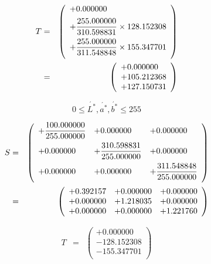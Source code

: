 \documentclass{article}
\begin{document}
\begin{eqnarray*} T &=& \left( \begin{array}{l} +0.000000 \vspace{.5em} \\ +\dfrac{255.000000}{310.598831}\times 128.152308 \vspace{.5em} \\ +\dfrac{255.000000}{311.548848}\times 155.347701 \vspace{.5em} \\ \end{array} \right) \\ &=& \left( \begin{array}{l} +0.000000 \\ +105.212368 \\ +127.150731 \\ \end{array} \right) \\ \end{eqnarray*}
\pagebreak

\[ 0 \le \acute{L^{*}}, \acute{a^{*}}, \acute{b^{*}} \le 255 \]
\pagebreak

\begin{eqnarray*} S &=& \left( \begin{array}{lll} +\dfrac{100.000000}{255.000000} & +0.000000 & +0.000000 \vspace{.5em} \\ +0.000000 & +\dfrac{310.598831}{255.000000} & +0.000000 \vspace{.5em} \\ +0.000000 & +0.000000 & +\dfrac{311.548848}{255.000000} \vspace{.5em} \\ \end{array} \right) \\ &=& \left( \begin{array}{lll} +0.392157 & +0.000000 & +0.000000 \\ +0.000000 & +1.218035 & +0.000000 \\ +0.000000 & +0.000000 & +1.221760 \\ \end{array} \right) \\ \end{eqnarray*}
\pagebreak

\begin{eqnarray*} T &=& \left( \begin{array}{l} +0.000000 \\ -128.152308 \\ -155.347701 \\ \end{array} \right) \\ \end{eqnarray*}
\pagebreak
\end{document}
